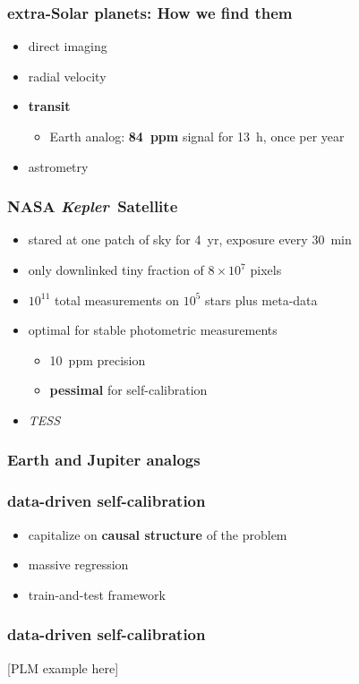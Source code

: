 \documentclass{beamer}
\renewcommand{\emph}[1]{\textbf{#1}}
\newcommand{\project}[1]{\textsl{#1}}
\newcommand{\Kepler}{\project{Kepler}}
\begin{document}
\begin{frame}
  \frametitle{extra-Solar planets: How we find them}
  \begin{itemize}
  \item direct imaging
  \item radial velocity
  \item \emph{transit}
    \begin{itemize}
    \item Earth analog: \emph{84~ppm} signal for 13~h, once per year
    \end{itemize}
  \item astrometry
  \end{itemize}
\end{frame}

\begin{frame}
  \frametitle{NASA \Kepler\ Satellite}
  \begin{itemize}
  \item stared at one patch of sky for 4~yr, exposure every 30~min
  \item only downlinked tiny fraction of $8\times 10^7$ pixels
  \item $10^{11}$ total measurements on $10^5$ stars plus meta-data
  \item optimal for stable photometric measurements
    \begin{itemize}
    \item 10~ppm precision
    \item \emph{pessimal} for self-calibration
    \end{itemize}
  \item \project{TESS}
  \end{itemize}
\end{frame}

\begin{frame}
  \frametitle{Earth and Jupiter analogs}
\end{frame}

\begin{frame}
  \frametitle{data-driven self-calibration}
  \begin{itemize}
  \item capitalize on \emph{causal structure} of the problem
  \item massive regression
  \item train-and-test framework
  \end{itemize}
\end{frame}

\begin{frame}
  \frametitle{data-driven self-calibration}
  [PLM example here]
\end{frame}
\end{document}
